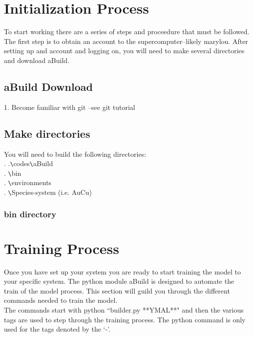 \documentclass{article}
\begin{document}
\section{Initialization Process}
To start working there are a series of steps and proceedure that must
be followed. The first step is to obtain an account to the supercomputer--likely
marylou. After setting up and account and logging on, you will need to
make several directories and download aBuild.  
\subsection{aBuild Download}
1. Become familiar with git --see git tutorial
\subsection{Make directories}
You will need to build the following directories:\\
. .\verb|\|codes\verb|\|aBuild\\
. \verb|\|bin\\
. \verb|\|environments\\
. \verb|\|Species-system (i.e. AuCu)

\subsubsection{bin directory}
\section{Training Process}                      
Once you have set up your system you are ready to start training the
model to your specific system. The python module aBuild is designed to
automate the train of the model process. This section will guild you
through the different commands needed to train the model.\\

The commands start with python ``builder.py **YMAL**" and then the
various tags are used to step through the training process. The python
command is only used for the tags denoted by the `-'.
\end{document}
